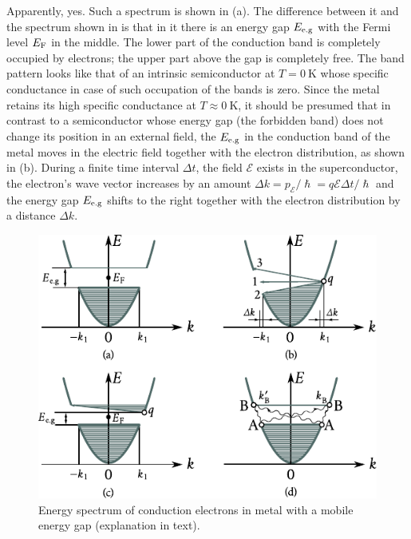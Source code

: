 Apparently, yes. Such a spectrum is shown in (a). The difference between it and the spectrum shown in  is that in it there is an energy gap $E_{\text{e.g}}$ with the Fermi level $E_{\text{F}}$ in the middle. The lower part of the conduction band is completely occupied by electrons; the upper part above the gap is completely free. The band pattern looks like that of an intrinsic semiconductor at $T=\SI{0}{\kelvin}$ whose specific conductance in case of such occupation of the bands is zero. Since the metal retains its high specific conductance at $T\approx\SI{0}{\kelvin}$, it should be presumed that in contrast to a semiconductor whose energy gap (the forbidden band) does not change its position in an external field, the $E_{\text{e.g}}$ in the conduction band of the metal moves in the electric field together with the electron distribution, as shown in (b). During a finite time interval $\Delta{t}$, the field $\mathcal{E}$ exists in the superconductor, the electron's wave vector increases by an amount $\Delta{k}=p_{\mathcal{E}}/\hslash=q\mathcal{E}\Delta{t}/\hslash$ and the energy gap $E_{\text{e.g}}$ shifts to the right together with the electron distribution by a distance $\Delta{k}$.

\begin{figure}[t]
	\begin{center}
		\includegraphics[scale=1.05]{figures/ch_06/fig_6_29.pdf}
		\caption[]{Energy spectrum of conduction electrons in metal with a mobile energy gap (explanation in text).}
		\label{fig:6_29}
	\end{center}
	\vspace{-0.7cm}
\end{figure}

